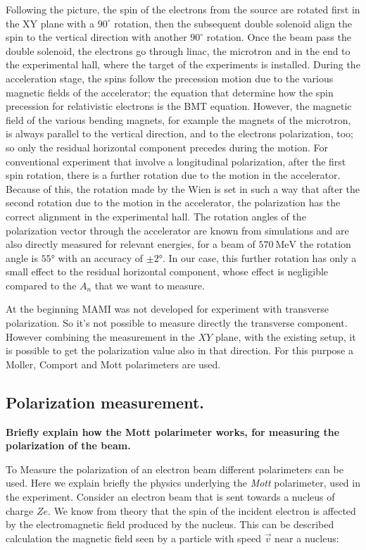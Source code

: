Following the picture, the spin of the electrons from the source are rotated first in the XY plane with a $90^{\circ}$ rotation, then the subsequent double solenoid align the spin to the vertical direction with another $90^{\circ}$ rotation. 
Once the beam pass the double solenoid, the electrons go through linac, the microtron and in the end to the experimental hall, where the target of the experiments is installed. During the acceleration stage, the spins follow the precession motion due to the various magnetic fields of the accelerator; the equation that determine how the spin precession for relativistic electrons is the BMT equation.
However, the magnetic field of the various bending magnets, for example the magnets of the microtron, is always parallel to the vertical direction, and to the electrons polarization, too; so only the residual horizontal component precedes during the motion. For conventional experiment that involve a longitudinal polarization, after the first spin rotation, there is a further rotation due to the motion in the accelerator. Because of this, the rotation made by the Wien is set in such a way that after the second rotation due to the motion in the accelerator, the polarization has the correct alignment in the experimental hall. The rotation angles of the polarization vector through the accelerator are known from simulations and are also directly measured for relevant energies, for a beam of $\SI{570}{\mega \electronvolt}$ the rotation angle is $\ang{55}$ with an accuracy of $\pm \ang{2}$. In our case, this further rotation has only a small effect to the residual horizontal component, whose effect is negligible compared to the $A_{n}$ that we want to measure.

At the beginning MAMI was not developed for experiment with transverse polarization. So it's not possible to measure directly the transverse component. However combining the measurement in the $XY$ plane, with the existing setup, it is possible to get the polarization value also in that direction. For this purpose a Moller, Comport and Mott polarimeters are used.


\subsection{Polarization measurement.}
{\bfseries Briefly explain how the Mott polarimeter works, for measuring the polarization of the beam.}

To Measure the polarization of an electron beam different polarimeters can be used. Here we explain briefly the physics underlying the \textit{Mott} polarimeter, used in the experiment.
Consider an electron beam that is sent towards a nucleus of charge $Ze$. We know from theory that the spin of the incident electron is affected by the electromagnetic field produced by the nucleus. This can be described calculation the magnetic field seen by a particle with speed $\vec{v}$ near a nucleus:

